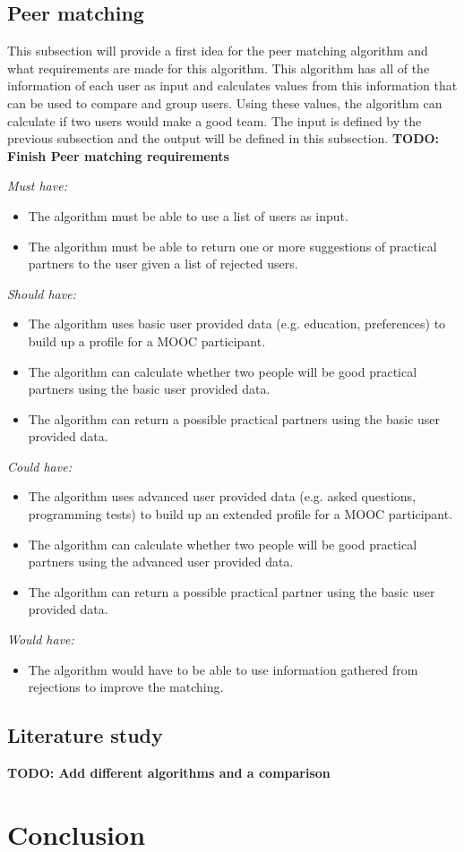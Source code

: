\documentclass[]{article}
\newcommand{\TODO}[1]{{\color{red}\textbf{TODO: #1}}}
\newcommand{\reqr}[1]{{\noindent\emph{#1:}}}
\begin{document}
\subsection{Peer matching}
This subsection will provide a first idea for the peer matching algorithm and what requirements are made for this algorithm.
This algorithm has all of the information of each user as input and calculates values from this information that can be used to compare and group users.
Using these values, the algorithm can calculate if two users would make a good team.
The input is defined by the previous subsection and the output will be defined in this subsection.
\TODO{Finish Peer matching requirements}

\reqr{Must have}
\begin{itemize}
\item The algorithm must be able to use a list of users as input.
\item The algorithm must be able to return one or more suggestions of practical partners to the user given a list of rejected users.
\end{itemize}

\reqr{Should have}
\begin{itemize}
\item The algorithm uses basic user provided data (e.g. education, preferences) to build up a profile for a MOOC participant.
\item The algorithm can calculate whether two people will be good practical partners using the basic user provided data.
\item The algorithm can return a possible practical partners using the basic user provided data.
\end{itemize}

\reqr{Could have}
\begin{itemize}
\item The algorithm uses advanced user provided data (e.g. asked questions, programming tests) to build up an extended profile for a MOOC participant.
\item The algorithm can calculate whether two people will be good practical partners using the advanced user provided data.
\item The algorithm can return a possible practical partner using the basic user provided data.
\end{itemize}

\reqr{Would have}
\begin{itemize}
\item The algorithm would have to be able to use information gathered from rejections to improve the matching.
\end{itemize}

\subsection{Literature study}
\cite{cmu}
\TODO{Add different algorithms and a comparison}

\section{Conclusion}

\newpage


\end{document}
